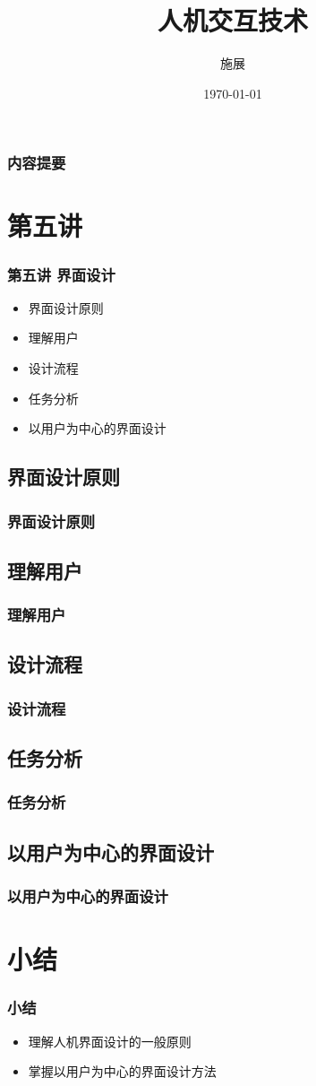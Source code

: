 \documentclass{beamer}
\title{人机交互技术}
\author{施展}
\institute{华中科技大学~武汉光电国家实验室}
\date{\today}
\begin{document}
\begin{frame}
	\titlepage
\end{frame}

\begin{frame}
	\frametitle{内容提要}
	\tableofcontents
\end{frame}

\section{第五讲}
\begin{frame}
	\frametitle{第五讲 界面设计}
	\begin{itemize}
		\item 界面设计原则
		\item 理解用户
		\item 设计流程
		\item 任务分析
		\item 以用户为中心的界面设计
	\end{itemize}
\end{frame}

\subsection{界面设计原则}
\begin{frame}
	\frametitle{界面设计原则}

\end{frame}

\subsection{理解用户}
\begin{frame}
	\frametitle{理解用户}

\end{frame}

\subsection{设计流程}
\begin{frame}
	\frametitle{设计流程}

\end{frame}

\subsection{任务分析}
\begin{frame}
	\frametitle{任务分析}

\end{frame}

\subsection{以用户为中心的界面设计}
\begin{frame}
	\frametitle{以用户为中心的界面设计}

\end{frame}

\section{小结}
\begin{frame}
	\frametitle{小结}
	\begin{itemize}
		\item 理解人机界面设计的一般原则
		\item 掌握以用户为中心的界面设计方法
	\end{itemize}
\end{frame}
\end{document}
